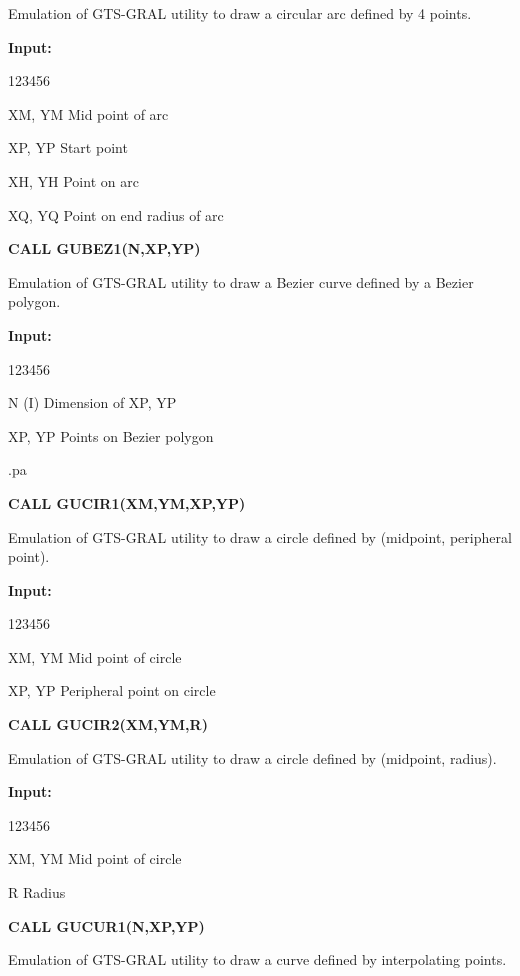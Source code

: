 \begin{OL}
Emulation of GTS-GRAL utility to draw a circular arc defined by 4 points.
 
{\bf Input:}
\begin{DLtt}{123456}
\item[XM, YM]Mid point of arc
\item[XP, YP]Start point
\item[XH, YH]Point on arc
\item[XQ, YQ]Point on end radius of arc
\end{DLtt}
\item {\bf CALL GUBEZ1(N,XP,YP)}
 
Emulation of GTS-GRAL utility to draw a Bezier curve defined by a
Bezier polygon.
 
{\bf Input:}
\begin{DLtt}{123456}
\item[N (I)]Dimension of XP, YP
\item[XP, YP]Points on Bezier polygon
\end{DLtt}
.pa
\item {\bf CALL GUCIR1(XM,YM,XP,YP)}
 
Emulation of GTS-GRAL utility to draw a circle defined by
(midpoint, peripheral point).
 
{\bf Input:}
\begin{DLtt}{123456}
\item[XM, YM]Mid point of circle
\item[XP, YP]Peripheral point on circle
\end{DLtt}
\item {\bf CALL GUCIR2(XM,YM,R)}
 
Emulation of GTS-GRAL utility to draw a circle defined by
(midpoint, radius).
 
{\bf Input:}
\begin{DLtt}{123456}
\item[XM, YM]Mid point of circle
\item[R]Radius
\end{DLtt}
\item {\bf CALL GUCUR1(N,XP,YP)}
 
Emulation of GTS-GRAL utility to draw a curve defined by interpolating points.
 

\end{OL}
